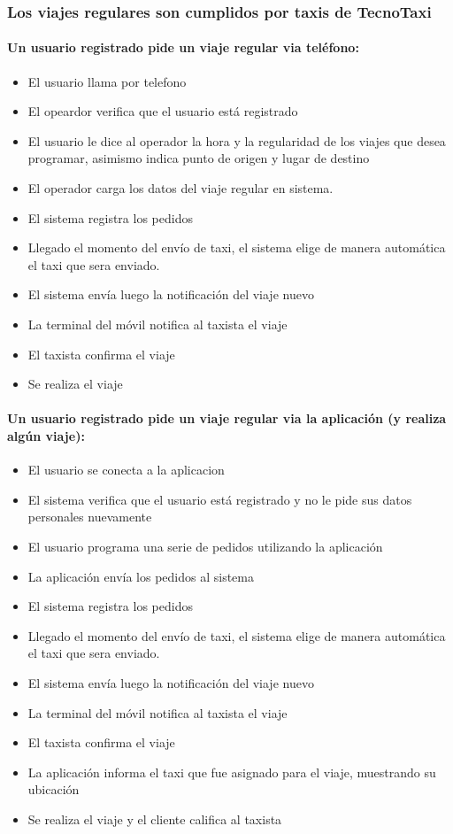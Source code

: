 \documentclass[a4paper]{article}
\begin{document}
\subsubsection{Los viajes regulares son cumplidos por taxis de TecnoTaxi}

\paragraph{Un usuario registrado pide un viaje regular via tel\'efono:}
\begin{itemize}
\item El usuario llama por telefono
\item El opeardor verifica que el usuario est\'a registrado
\item El usuario le dice al operador la hora y la regularidad de los viajes que desea programar, asimismo indica punto de origen y lugar de destino
\item El operador carga los datos del viaje regular en sistema.
\item El sistema registra los pedidos 
\item Llegado el momento del env\'io de taxi, el sistema elige de manera autom\'atica el taxi que sera enviado.
\item El sistema env\'ia luego la notificaci\'on del viaje nuevo
\item La terminal del m\'ovil notifica al taxista el viaje
\item El taxista confirma el viaje
\item Se realiza el viaje
\end{itemize}


\paragraph{Un usuario registrado pide un viaje regular via la aplicaci\'on (y realiza alg\'un viaje):}
\begin{itemize}
\item El usuario se conecta a la aplicacion
\item El sistema verifica que el usuario est\'a registrado y no le pide sus datos personales nuevamente
\item El usuario programa una serie de pedidos utilizando la aplicaci\'on
\item La aplicaci\'on env\'ia los pedidos al sistema
\item El sistema registra los pedidos 
\item Llegado el momento del env\'io de taxi, el sistema elige de manera autom\'atica el taxi que sera enviado.
\item El sistema env\'ia luego la notificaci\'on del viaje nuevo
\item La terminal del m\'ovil notifica al taxista el viaje
\item El taxista confirma el viaje
\item La aplicaci\'on informa el taxi que fue asignado para el viaje, muestrando su ubicaci\'on
\item Se realiza el viaje y el cliente califica al taxista
\end{itemize}
\end{document}
